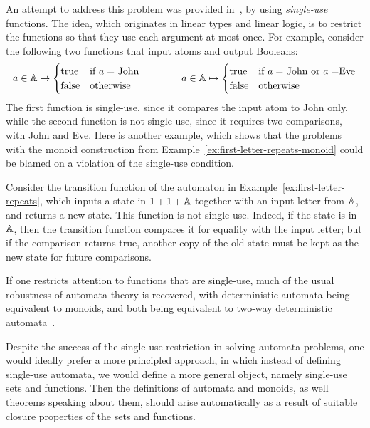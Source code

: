 An attempt to address this problem was provided in~\cite{stefansk-msc,stefanski-phd,bojanczykstefanski2020}, by using \emph{single-use} functions. The idea, which originates in linear types and linear logic,  is to restrict the functions so that they use each argument at most once. For example, consider the following two functions that input atoms and output Booleans:
\begin{align*}
a \in \mathbb A \mapsto 
\begin{cases}
    \text{true} & \text{if $a=$ John}\\
    \text{false} & \text{otherwise}
\end{cases}
\qquad \qquad 
a \in \mathbb A \mapsto 
\begin{cases}
    \text{true} & \text{if $a=$ John or $a = $Eve}\\
    \text{false} & \text{otherwise}
\end{cases}
\end{align*}
The first function is single-use, since it compares the input atom to John only, while the second function is not single-use, since it requires two comparisons, with John and Eve. Here is another example, which shows that the problems with the monoid construction from Example~\ref{ex:first-letter-repeats-monoid} could be blamed on a violation of the single-use condition.
\begin{example}
    Consider  the transition function of the automaton in Example~\ref{ex:first-letter-repeats}, which inputs a state in $1 + 1 + \mathbb A$ together with an input letter from $\mathbb A$, and returns a new state.  This function is not single use. Indeed, if the state is in $\mathbb A$, then the transition function compares it for equality with the input letter; but if the comparison returns true, another copy of the old state must be kept as the new state for future comparisons. \exampleend
\end{example}

If one restricts attention to functions that are single-use, much of the usual robustness of automata theory is recovered, with deterministic automata being equivalent to monoids, and both being equivalent to two-way deterministic automata~\cite{bojanczykstefanski2020}.

Despite the success of the single-use restriction in solving automata problems, one would ideally prefer a more principled approach, in which instead of defining single-use automata, we would define a more general object, namely single-use sets and functions. Then the definitions of  automata and monoids, as well theorems speaking about them, should arise automatically as a result of suitable closure properties of the sets and functions.

